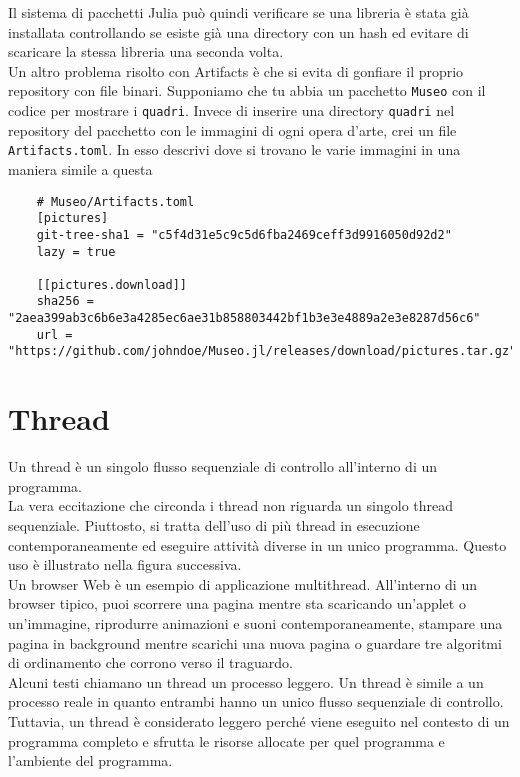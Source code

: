 \documentclass[a4paper]{extreport}
\begin{document}
Il sistema di pacchetti Julia può quindi verificare se una libreria è stata già installata controllando se esiste già una directory con un hash ed evitare di scaricare la stessa libreria una seconda volta.
\\Un altro problema risolto con Artifacts è che si evita di gonfiare il proprio repository con file binari. Supponiamo che tu abbia un pacchetto \verb|Museo| con il codice per mostrare i \verb|quadri|. Invece di inserire una directory \verb|quadri| nel repository del pacchetto con le immagini di ogni opera d'arte, crei un file \verb|Artifacts.toml|. In esso descrivi dove si trovano le varie immagini in una maniera simile a questa
{\small\begin{verbatim}
    # Museo/Artifacts.toml 
    [pictures]
    git-tree-sha1 = "c5f4d31e5c9c5d6fba2469ceff3d9916050d92d2"
    lazy = true

    [[pictures.download]]
    sha256 = "2aea399ab3c6b6e3a4285ec6ae31b858803442bf1b3e3e4889a2e3e8287d56c6"
    url = "https://github.com/johndoe/Museo.jl/releases/download/pictures.tar.gz"
\end{verbatim}}
\section*{Thread}
Un thread è un singolo flusso sequenziale di controllo all'interno di un programma.~\cite{threads}\\
La vera eccitazione che circonda i thread non riguarda un singolo thread sequenziale. Piuttosto, si tratta dell'uso di più thread in esecuzione contemporaneamente ed eseguire attività diverse in un unico programma. Questo uso è illustrato nella figura successiva.
\\Un browser Web è un esempio di applicazione multithread. All'interno di un browser tipico, puoi scorrere una pagina mentre sta scaricando un'applet o un'immagine, riprodurre animazioni e suoni contemporaneamente, stampare una pagina in background mentre scarichi una nuova pagina o guardare tre algoritmi di ordinamento che corrono verso il traguardo.
\\Alcuni testi chiamano un thread un processo leggero. Un thread è simile a un processo reale in quanto entrambi hanno un unico flusso sequenziale di controllo. Tuttavia, un thread è considerato leggero perché viene eseguito nel contesto di un programma completo e sfrutta le risorse allocate per quel programma e l'ambiente del programma.
\end{document}
